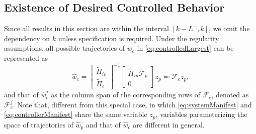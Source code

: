 \documentclass[11pt,print,draftcls,onecolumn,romanappendices]{ieeecolor}
\newcommand{\F}{\mathcal{F}}
\begin{document}
{\subsection{Existence of Desired Controlled Behavior}\label{sec:existence}
Since all results in this section are within the interval $[k-L^-,k]$, we omit the dependency on $k$ unless specification is required. Under the regularity assumptions, all possible trajectories of $w_c$ in \eqref{eq:controlledLargest} can be represented as
\begin{equation}\label{eq:controllerManifest}
    \hat{w}_c=\begin{bmatrix}
        \widetilde{\Pi}_{ic}\\ \widetilde{\Pi}_c
    \end{bmatrix}^{-1}\begin{bmatrix}
        \widetilde{\Pi}_{ip}\F_p\\ 0
    \end{bmatrix}z_p\eqqcolon\F_cz_p,
\end{equation}
and that of $\hat{w}_c^j$ as the column span of the corresponding rows of $\F_c$, denoted as $\F_c^j$. Note that, different from this special case, in which \eqref{eq:systemManifest} and \eqref{eq:controllerManifest} share the same variable $z_p$, variables parameterizing the space of trajectories of $\hat{w}_p$ and that of $\hat{w}_c$ are different in general.

}
\end{document}
